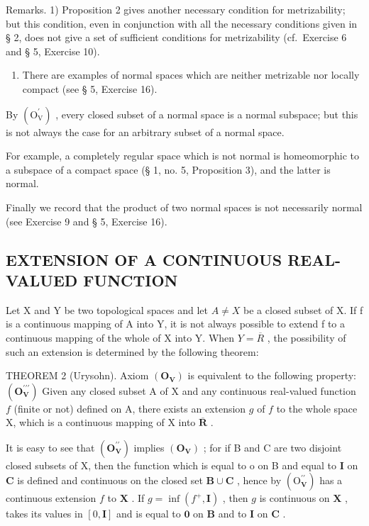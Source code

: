 Remarks. 1) Proposition 2 gives another necessary condition for metrizability; but this condition, even in conjunction with all the necessary conditions given in § 2, does not give a set of sufficient conditions for metrizability (cf.~Exercise 6 and § 5, Exercise 10).

\begin{enumerate}
\def\labelenumi{\arabic{enumi})}
\setcounter{enumi}{1}
\tightlist
\item
  There are examples of normal spaces which are neither metrizable nor locally compact (see § 5, Exercise 16).
\end{enumerate}

By \((\mathrm{O}_{\mathrm{V}}^{\prime})\) , every closed subset of a normal space is a normal subspace; but this is not always the case for an arbitrary subset of a normal space.

For example, a completely regular space which is not normal is homeomorphic to a subspace of a compact space (§ 1, no. 5, Proposition 3), and the latter is normal.

Finally we record that the product of two normal spaces is not necessarily normal (see Exercise 9 and § 5, Exercise 16).

\subsection{EXTENSION OF A CONTINUOUS REAL-VALUED FUNCTION}

Let X and Y be two topological spaces and let \(A \neq X\) be a closed subset of X. If f is a continuous mapping of A into Y, it is not always possible to extend f to a continuous mapping of the whole of X into Y. When \(Y = \overline{R}\) , the possibility of such an extension is determined by the following theorem:

THEOREM 2 (Urysohn). Axiom \((\mathbf{O}_{\mathbf{V}})\) is equivalent to the following property: \((\mathbf{O}_{\mathbf{V}}^{\prime \prime \prime})\) Given any closed subset A of X and any continuous real-valued function \(f\) (finite or not) defined on A, there exists an extension \(g\) of \(f\) to the whole space X, which is a continuous mapping of X into \(\overline{\mathbf{R}}\) .

It is easy to see that \((\mathbf{O}_{\mathbf{V}}^{\prime\prime})\) implies \((\mathbf{O}_{\mathbf{V}})\) ; for if B and C are two disjoint closed subsets of X, then the function which is equal to o on B and equal to \(\mathbf{I}\) on \(\mathbf{C}\) is defined and continuous on the closed set \(\mathbf{B} \cup \mathbf{C}\) , hence by \((\mathrm{O}_{\mathbf{V}}^{\prime \prime})\) has a continuous extension \(f\) to \(\mathbf{X}\) . If \(g = \inf (f^{+}, \mathbf{I})\) , then \(g\) is continuous on \(\mathbf{X}\) , takes its values in \([0, \mathbf{I}]\) and is equal to \(\mathbf{0}\) on \(\mathbf{B}\) and to \(\mathbf{I}\) on \(\mathbf{C}\) .

